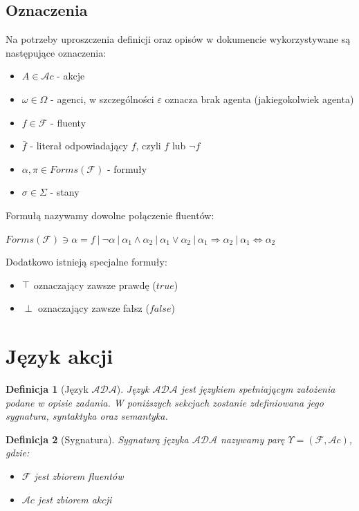 \documentclass[11pt,a4paper]{article}
\newtheorem{definition}{Definicja}[section]
\def\tang{\ThisStyle{\abovebaseline[0pt]{\scalebox{-1}{$\SavedStyle\perp$}}}}
\begin{document}
    \subsection{Oznaczenia}
        Na potrzeby uproszczenia definicji oraz opisów w dokumencie wykorzystywane są następujące oznaczenia:
    \begin{itemize}
        \item $A \in \mathcal{A}c$ - akcje
        \item $\omega \in \Omega$ - agenci, w szczególności $\varepsilon$ oznacza brak agenta (jakiegokolwiek agenta)
        \item $f \in \mathcal{F}$ - fluenty
        \item $\bar{f}$ - literał odpowiadający $f$, czyli $f$ lub $\neg f$
        \item $\alpha, \pi \in Forms(\mathcal{F})$ - formuły
        \item $\sigma \in \Sigma$ - stany
    \end{itemize}
   
    Formułą nazywamy dowolne połączenie fluentów:
    
    $Forms(\mathcal{F}) \ni \alpha = f~|~\neg \alpha~|~\alpha_1 \wedge \alpha_2~|~\alpha_1 \vee \alpha_2~|~\alpha_1 \Rightarrow \alpha_2~|~\alpha_1 \Leftrightarrow \alpha_2$
    
    Dodatkowo istnieją specjalne formuły:
    \begin{itemize}
        \item $\tang$ oznaczający zawsze prawdę ($true$)
        \item $\perp$ oznaczający zawsze fałsz ($false$)
    \end{itemize}

    \section{Język akcji}
    \begin{definition}[Język $\mathcal{ADA}$]
        Język $\mathcal{ADA}$ jest językiem spełniającym założenia podane w opisie zadania. W poniższych sekcjach zostanie zdefiniowana jego sygnatura, syntaktyka oraz semantyka.
    \end{definition}

    \begin{definition}[Sygnatura]
        Sygnaturą języka $\mathcal{ADA}$ nazywamy parę $\Upsilon=(\mathcal{F},\mathcal{A}c)$, gdzie:
        \begin{itemize}
            \item $\mathcal{F}$ jest zbiorem fluentów
            \item $\mathcal{A}c$ jest zbiorem akcji
        \end{itemize}
    \end{definition}
    
\end{document}
